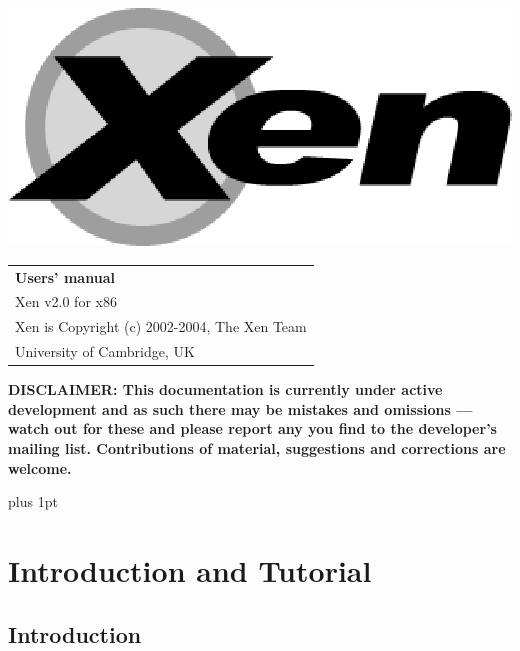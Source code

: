 \documentclass[11pt,twoside,final,openright]{xenstyle}
\begin{document}
\pagestyle{empty}
\begin{center}
\vspace*{\fill}
\includegraphics{figs/xenlogo.eps}
\vfill
\vfill
\vfill
\begin{tabular}{l}
{\Huge \bf Users' manual} \\[4mm]
{\huge Xen v2.0 for x86} \\[80mm]

{\Large Xen is Copyright (c) 2002-2004, The Xen Team} \\[3mm]
{\Large University of Cambridge, UK} \\[20mm]
\end{tabular}
\end{center}

{\bf
DISCLAIMER: This documentation is currently under active development
and as such there may be mistakes and omissions --- watch out for
these and please report any you find to the developer's mailing list.
Contributions of material, suggestions and corrections are welcome.
}

\vfill
\cleardoublepage

\pagestyle{plain}
{ \parskip 0pt plus 1pt
  \tableofcontents }
\cleardoublepage

\raggedbottom
{}
\parindent=0pt
\parskip=5pt
\renewcommand{\topfraction}{.8}
\renewcommand{\bottomfraction}{.8}
\renewcommand{\textfraction}{.2}
\renewcommand{\floatpagefraction}{.8}

\newcommand{\path}[1]{{\tt #1}}

\part{Introduction and Tutorial}
\chapter{Introduction}
\end{document}
